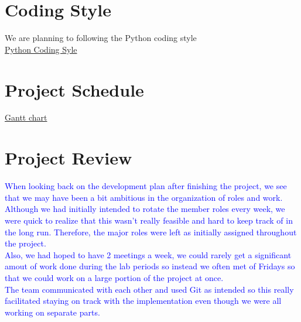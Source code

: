 \documentclass{article}
\begin{document}
\section{Coding Style}
We are planning to following the Python coding style\\
\href{https://google.github.io/styleguide/pyguide.html}{Python Coding Syle}

\section{Project Schedule}
\href{run:../../ProjectSchedule/Gantt-FinalSubmission.pdf}{Gantt chart}

\section{Project Review}
\textcolor{blue}{When looking back on the development plan after finishing the project, we see that we may have been a bit ambitious in the organization of roles and work. Although we had initially intended to rotate the member roles every week, we were quick to realize that this wasn't really feasible and hard to keep track of in the long run. Therefore, the major roles were left as initially assigned throughout the project.} \\

\textcolor{blue}{Also, we had hoped to have 2 meetings a week, we could rarely get a significant amout of work done during the lab periods so instead we often met of Fridays so that we could work on a large portion of the project at once.} \\

\textcolor{blue}{The team communicated with each other and used Git as intended so this really facilitated staying on track with the implementation even though we were all working on separate parts.}
\end{document}

